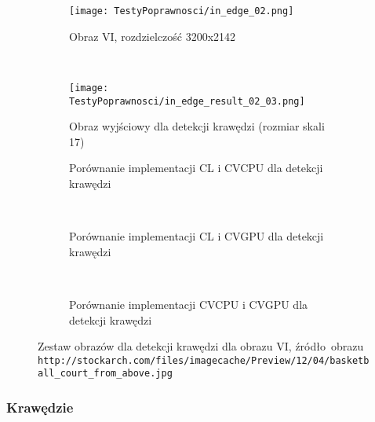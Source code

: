 \begin{figure}[h]

\begin{center}
\begin{subfigure}[t]{0.3\textwidth}
\texttt{[image: TestyPoprawnosci/in\_edge\_02.png]}
\caption{Obraz VI, rozdzielczość 3200x2142}
\label{fig:valEdge02}
\end{subfigure}
~
\begin{subfigure}[t]{0.3\textwidth}
\texttt{[image: TestyPoprawnosci/in\_edge\_result\_02\_03.png]}
\caption{Obraz wyjściowy dla detekcji krawędzi (rozmiar skali 17)}
\label{fig:valEdgeResult02}
\end{subfigure}
\end{center}

\begin{subfigure}[t]{0.3\textwidth}
	\centering
	\setlength\fboxsep{0pt}
	\setlength\fboxrule{0.5pt}
	\caption{Porównanie implementacji CL i CVCPU dla detekcji krawędzi}
	\label{fig:valEdge2CLCVCPU}
\end{subfigure}
~
\begin{subfigure}[t]{0.3\textwidth}
	\centering
	\setlength\fboxsep{0pt}
	\setlength\fboxrule{0.5pt}
	\caption{Porównanie implementacji CL i CVGPU dla detekcji krawędzi}
	\label{fig:valEdge2CLCVGPU}
\end{subfigure}
~
\begin{subfigure}[t]{0.3\textwidth}
	\centering
	\setlength\fboxsep{0pt}
	\setlength\fboxrule{0.5pt}
	\caption{Porównanie implementacji CVCPU i CVGPU dla detekcji krawędzi}
	\label{fig:valEdge2CVCPUCVGPU}                 
\end{subfigure}
\caption{Zestaw obrazów dla detekcji krawędzi dla obrazu VI, \tiny{źródło~obrazu \texttt{http://stockarch.com/files/imagecache/Preview/12/04/basketball\_court\_from\_above.jpg}}}

\label{fig:valEdge2}
\end{figure}

\subsubsection{Krawędzie}
\label{subsubsec:krawedzieRysunki}


